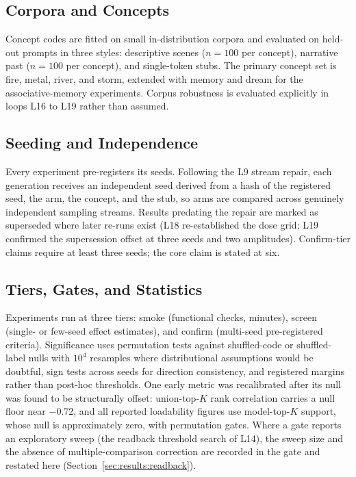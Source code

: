 \subsection{Corpora and Concepts}

Concept codes are fitted on small in-distribution corpora and evaluated on held-out prompts in three styles: descriptive scenes ($n=100$ per concept), narrative past ($n=100$ per concept), and single-token stubs. The primary concept set is fire, metal, river, and storm, extended with memory and dream for the associative-memory experiments. Corpus robustness is evaluated explicitly in loops L16 to L19 rather than assumed.

\subsection{Seeding and Independence}

Every experiment pre-registers its seeds. Following the L9 stream repair, each generation receives an independent seed derived from a hash of the registered seed, the arm, the concept, and the stub, so arms are compared across genuinely independent sampling streams. Results predating the repair are marked as superseded where later re-runs exist (L18 re-established the dose grid; L19 confirmed the supersession offset at three seeds and two amplitudes). Confirm-tier claims require at least three seeds; the core claim is stated at six.

\subsection{Tiers, Gates, and Statistics}

Experiments run at three tiers: smoke (functional checks, minutes), screen (single- or few-seed effect estimates), and confirm (multi-seed pre-registered criteria). Significance uses permutation tests against shuffled-code or shuffled-label nulls with $10^4$ resamples where distributional assumptions would be doubtful, sign tests across seeds for direction consistency, and registered margins rather than post-hoc thresholds. One early metric was recalibrated after its null was found to be structurally offset: union-top-$K$ rank correlation carries a null floor near $-0.72$, and all reported loadability figures use model-top-$K$ support, whose null is approximately zero, with permutation gates. Where a gate reports an exploratory sweep (the readback threshold search of L14), the sweep size and the absence of multiple-comparison correction are recorded in the gate and restated here (Section~\ref{sec:results:readback}).

